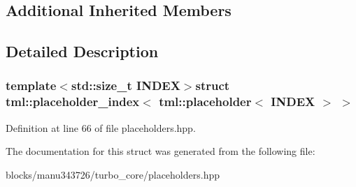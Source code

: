 \subsection*{Additional Inherited Members}


\subsection{Detailed Description}
\subsubsection*{template$<$std\+::size\+\_\+t I\+N\+D\+E\+X$>$struct tml\+::placeholder\+\_\+index$<$ tml\+::placeholder$<$ I\+N\+D\+E\+X $>$ $>$}



Definition at line 66 of file placeholders.\+hpp.



The documentation for this struct was generated from the following file\+:\begin{DoxyCompactItemize}
\item 
blocks/manu343726/turbo\+\_\+core/placeholders.\+hpp\end{DoxyCompactItemize}
